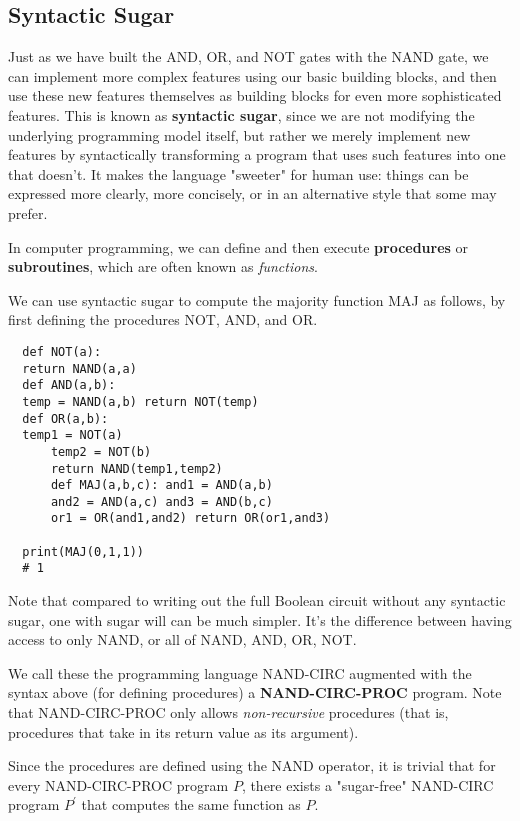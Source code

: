 \documentclass{article}
\begin{document}
  \subsection{Syntactic Sugar}
  Just as we have built the AND, OR, and NOT gates with the NAND gate, we can implement more complex features using our basic building blocks, and then use these new features themselves as building blocks for even more sophisticated features. This is known as \textbf{syntactic sugar}, since we are not modifying the underlying programming model itself, but rather we merely implement new features by syntactically transforming a program that uses such features into one that doesn’t. It makes the language "sweeter" for human use: things can be expressed more clearly, more concisely, or in an alternative style that some may prefer.

  In computer programming, we can define and then execute \textbf{procedures} or \textbf{subroutines}, which are often known as \textit{functions}. 

  \begin{example}
  We can use syntactic sugar to compute the majority function MAJ as follows, by first defining the procedures NOT, AND, and OR. 
  \begin{lstlisting}
  def NOT(a):
  return NAND(a,a)
  def AND(a,b):
  temp = NAND(a,b) return NOT(temp)
  def OR(a,b):
  temp1 = NOT(a)
      temp2 = NOT(b)
      return NAND(temp1,temp2)
      def MAJ(a,b,c): and1 = AND(a,b)
      and2 = AND(a,c) and3 = AND(b,c)
      or1 = OR(and1,and2) return OR(or1,and3)

  print(MAJ(0,1,1))
  # 1
  \end{lstlisting}
  \end{example}

  Note that compared to writing out the full Boolean circuit without any syntactic sugar, one with sugar will can be much simpler. It's the difference between having access to only NAND, or all of NAND, AND, OR, NOT. 

  \begin{definition}
  We call these the programming language NAND-CIRC augmented with the syntax above (for defining procedures) a \textbf{NAND-CIRC-PROC} program. Note that NAND-CIRC-PROC only allows \textit{non-recursive} procedures (that is, procedures that take in its return value as its argument). 
  \end{definition}

  Since the procedures are defined using the NAND operator, it is trivial that for every NAND-CIRC-PROC program $P$, there exists a "sugar-free" NAND-CIRC program $P^\prime$ that computes the same function as $P$. 
\end{document}
